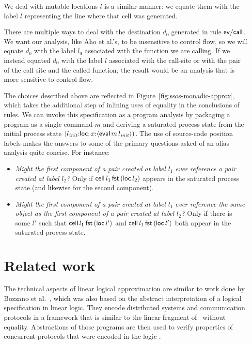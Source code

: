 We deal with mutable locations $l$ is a similar manner: we equate them
with the label $l$ representing the line where that cell was
generated.

There are multiple ways to deal with the destination $d_0$ generated
in rule ${\sf ev/call}$. We want our analysis, like Aho et al.'s, to
be insensitive to control flow, so we will equate $d_0$ with the label
$l_0$ associated with the function we are calling.  If we instead
equated $d_0$ with the label $l$ associated with the call-site or with
the pair of the call site and the called function, the result would be
an analysis that is more sensitive to control flow.

The choices described above are reflected in
Figure~\ref{fig:ssos-monadic-approx}, which takes the additional step
of inlining uses of equality in the conclusions of rules. We can
invoke this specification as a program analysis by packaging a program
as a single command $m$ and deriving a saturated process state from the
initial process state $(l_{\it init}{:}{\sf loc}; x{:}\langle {{\sf
    eval}\,m\,l_{\it init}} \rangle)$. The use of source-code position labels
makes the answers to some of the primary questions asked of an alias
analysis quite concise. For instance:

\smallskip
\begin{itemize}
\item {\it Might the first component of a pair created at label $l_1$
    ever reference a pair created at label $l_2$?} Only if ${\sf
    cell}\,l_1\,{\sf fst}\,({\sf loc}\,l_2)$ appears in the saturated
    process state (and likewise for the second component).
  \item {\it Might the first component of a pair created at label
      $l_1$ ever reference the same object as the first component of a
      pair created at label $l_2$?} Only if there is some $l'$ such
    that ${\sf cell}\,l_1\,{\sf fst}\,({\sf loc}\,l')$ and ${\sf
      cell}\,l_1\,{\sf fst}\,({\sf loc}\,l')$ both appear in the
    saturated process state.
\end{itemize}

\section{Related work}

The technical aspects of linear logical approximation are similar to
work done by Bozzano et al.~\cite{bozzano02effective,bozzano04model},
which was also based on the abstract interpretation of a logical
specification in linear logic.
They encode distributed systems and communication protocols in
a framework that is similar to the linear fragment of \sls~without
equality. Abstractions of those programs are then used to verify
properties of concurrent protocols that were encoded in the logic
\cite{bozzano02protocol}. 

